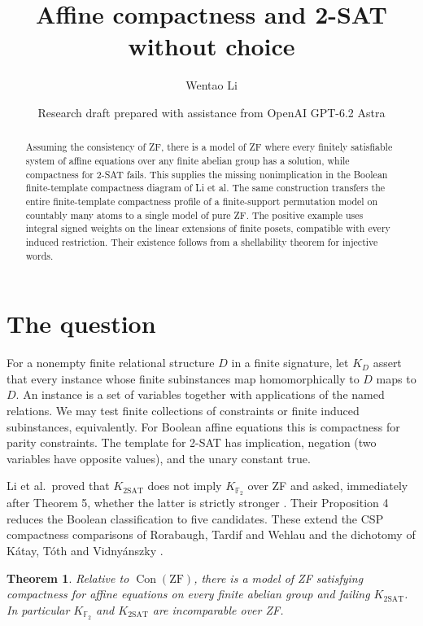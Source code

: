 \documentclass[11pt]{article}
\title{Affine compactness and 2-SAT without choice}
\author{Wentao Li}
\date{\small Research draft prepared with assistance from OpenAI GPT-6.2 Astra}
\newtheorem{theorem}{Theorem}
\begin{document}
\maketitle
\begin{abstract}
Assuming the consistency of ZF, there is a model of ZF where every finitely satisfiable system of affine equations over any finite abelian group has a solution, while compactness for 2-SAT fails. This supplies the missing nonimplication in the Boolean finite-template compactness diagram of Li et al. The same construction transfers the entire finite-template compactness profile of a finite-support permutation model on countably many atoms to a single model of pure ZF. The positive example uses integral signed weights on the linear extensions of finite posets, compatible with every induced restriction. Their existence follows from a shellability theorem for injective words.
\end{abstract}

\section{The question}
For a nonempty finite relational structure $D$ in a finite signature, let $K_D$ assert that every instance whose finite subinstances map homomorphically to $D$ maps to $D$. An instance is a set of variables together with applications of the named relations. We may test finite collections of constraints or finite induced subinstances, equivalently. For Boolean affine equations this is compactness for parity constraints. The template for 2-SAT has implication, negation (two variables have opposite values), and the unary constant true.

Li et al.\ proved that $K_{2\mathrm{SAT}}$ does not imply $K_{\mathbb F_2}$ over ZF and asked, immediately after Theorem 5, whether the latter is strictly stronger \cite{li}. Their Proposition 4 reduces the Boolean classification to five candidates. These extend the CSP compactness comparisons of Rorabaugh, Tardif and Wehlau and the dichotomy of K\'atay, T\'oth and Vidny\'anszky \cite{rtw,ktv}.

\begin{theorem}\label{main}
Relative to $\operatorname{Con}(\mathrm{ZF})$, there is a model of ZF satisfying compactness for affine equations on every finite abelian group and failing $K_{2\mathrm{SAT}}$. In particular $K_{\mathbb F_2}$ and $K_{2\mathrm{SAT}}$ are incomparable over ZF.
\end{theorem}
\end{document}
